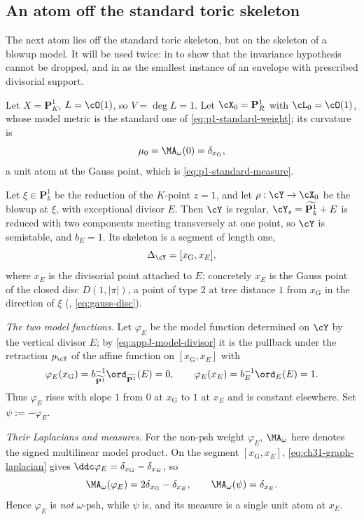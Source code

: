 \subsection{An atom off the standard toric skeleton}
\label{sec:ch31-p1-blowup}

The next atom lies off the standard toric skeleton, but on the skeleton
of a blowup model.  It will
be used twice: in  to show that the invariance
hypothesis cannot be dropped, and in  as the
smallest instance of an envelope with prescribed divisorial support.

\begin{example}
\label{ex:ch31-p1-blowup}
Let $X=\mathbf P^1_K$, $L=\cO(1)$, so $V=\deg L=1$.  Let
$\cX_0=\mathbf P^1_R$ with $\cL_0=\cO(1)$, whose model metric is the
standard one of \eqref{eq:p1-standard-weight}; its curvature is
\begin{equation}
\label{eq:ch31-p1-reference}
 \mu_0=\MA_\omega(0)=\delta_{x_{\mathrm G}},
\end{equation}
a unit atom at the Gauss point, which is \eqref{eq:p1-standard-measure}.

Let $\xi\in\mathbf P^1_k$ be the reduction of the $K$-point $z=1$, and
let $\rho:\cY\to\cX_0$ be the blowup at $\xi$, with exceptional divisor
$E$.  Then $\cY$ is regular, $\cY_s=\widetilde{\mathbf P^1_k}+E$ is
reduced with two components meeting transversely at one point, so $\cY$ is
semistable, and $b_E=1$.  Its skeleton is a segment of length one,
\[
 \Delta_{\cY}=[x_{\mathrm G},x_E],
\]
where $x_E$ is the divisorial point attached to $E$; concretely
$x_E$ is the Gauss point of the closed disc
$D(1,|\pi|)$, a point of type $2$ at tree distance $1$ from
$x_{\mathrm G}$ in the direction of $\xi$
(, \eqref{eq:gauss-disc}).

\emph{The two model functions.}  Let $\varphi_E$ be the model function
determined on $\cY$ by the vertical divisor $E$; by
\eqref{eq:appJ-model-divisor} it is the pullback under the retraction
$p_{\cY}$ of the affine function on $[x_{\mathrm G},x_E]$ with
\[
 \varphi_E(x_{\mathrm G})=b_{\widetilde{\mathbf P^1}}^{-1}
   \ord_{\widetilde{\mathbf P^1}}(E)=0,
 \qquad
 \varphi_E(x_E)=b_E^{-1}\ord_E(E)=1 .
\]
Thus $\varphi_E$ rises with slope $1$ from $0$ at $x_{\mathrm G}$ to
$1$ at $x_E$ and is constant elsewhere.  Set $\psi:=-\varphi_E$.

\emph{Their Laplacians and measures.}  For the non-psh weight
$\varphi_E$, $\MA_\omega$ here denotes the signed multilinear model
product.  On the segment
$[x_{\mathrm G},x_E]$, \eqref{eq:ch31-graph-laplacian} gives
$\ddc\varphi_E=\delta_{x_{\mathrm G}}-\delta_{x_E}$, so
\begin{equation}
\label{eq:ch31-p1-two-measures}
 \MA_\omega(\varphi_E)=2\delta_{x_{\mathrm G}}-\delta_{x_E},
 \qquad
 \MA_\omega(\psi)=\delta_{x_E}.
\end{equation}
Hence $\varphi_E$ is \emph{not} $\omega$-psh, while $\psi$ is, and its
measure is a single unit atom at $x_E$.


\end{example}
